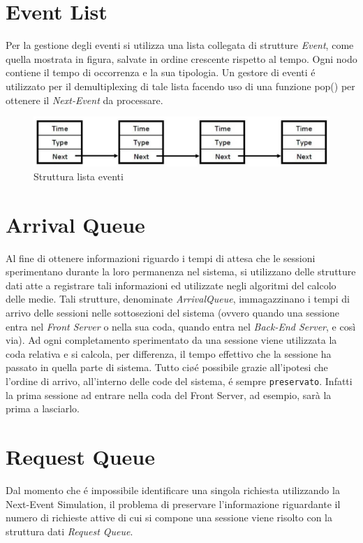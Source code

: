 \section{Event List}
Per la gestione degli eventi si utilizza una lista collegata di strutture 
\textit{Event}, come quella mostrata in figura, salvate in ordine crescente 
rispetto al tempo. Ogni nodo contiene il tempo di occorrenza e la sua tipologia. 
Un gestore di eventi \'e utilizzato per il demultiplexing di tale lista facendo 
uso di una funzione pop() per ottenere il \textit{Next-Event} da processare.
\begin{figure}[H]
  \centering
  \includegraphics[scale=0.5]{img/EventList.png}
  \caption[EventList]{Struttura lista eventi}
  \label{fig:eventList}
\end{figure}

\section{Arrival Queue}
Al fine di ottenere informazioni riguardo i tempi di attesa che le sessioni 
sperimentano durante la loro permanenza nel sistema, si utilizzano delle 
strutture dati atte a registrare tali informazioni ed utilizzate negli algoritmi 
del calcolo delle medie. Tali strutture, denominate \textit{ArrivalQueue}, 
immagazzinano i tempi di arrivo delle sessioni nelle sottosezioni del sistema 
(ovvero quando una sessione entra nel \textit{Front Server} o nella sua coda, 
quando entra nel \textit{Back-End Server}, e cos\`i via). Ad ogni completamento 
sperimentato da una sessione viene utilizzata la coda relativa e si calcola, per 
differenza, il tempo effettivo che la sessione ha passato in quella parte di 
sistema. Tutto ci\o \'e possibile grazie all'ipotesi che l'ordine di arrivo, 
all'interno delle code del sistema, \'e sempre \texttt{preservato}. Infatti la 
prima sessione ad entrare nella coda del Front Server, ad esempio, sar\`a la 
prima a lasciarlo.

\section{Request Queue}
Dal momento che \'e impossibile identificare una singola richiesta utilizzando 
la Next-Event Simulation, il problema di preservare l'informazione riguardante 
il numero di richieste attive di cui si compone una sessione viene risolto con 
la struttura dati \textit{Request Queue}. 

